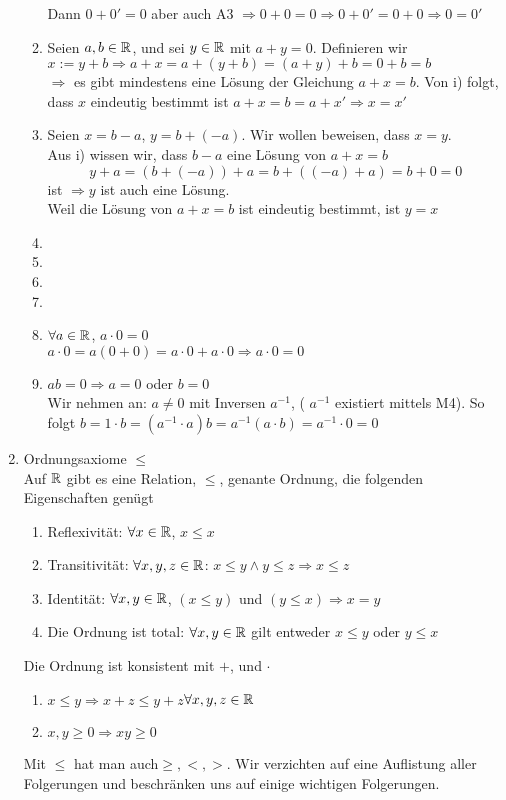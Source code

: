 \begin{enumerate}
\begin{enumerate}
\noindent Dann $0+0'=0$ aber auch A3 $\Rightarrow 0+0=0\Rightarrow 0+0'=0+0\Rightarrow 0=0'$
\item Seien $a,b\in\mathbb{R}$, und sei $y\in\mathbb{R}$ mit $a+y=0$. Definieren wir $x:=y+b\Rightarrow a+x=a+(y+b)=(a+y)+b=0+b=b$\\
$\Rightarrow$ es gibt mindestens eine Lösung der Gleichung $a+x=b$. Von i) folgt, dass $x$ eindeutig bestimmt ist $a+x=b=a+x' \Rightarrow x=x'$
\item Seien $x=b-a$, $y=b+(-a)$. Wir wollen beweisen, dass $x=y$.\\

\noindent Aus i) wissen wir, dass $b-a$ eine Lösung von $a+x=b$ \[y+a=\left( b+(-a)\right)+a=b+\left( (-a)+a\right)=b+0=0\] ist
$\Rightarrow y$ ist auch eine Lösung.\\
Weil die Lösung von $a+x=b$ ist eindeutig bestimmt, ist $y=x$
\item
\item
\item
\item
{}
\item $\forall a\in\mathbb{R}$, $a\cdot 0=0$\\
$a\cdot 0=a(0+0)=a\cdot 0+a\cdot 0\Rightarrow a\cdot 0=0$
\item $ab=0\Rightarrow a=0$ oder $b=0$\\
Wir nehmen an: $a\not=0$ mit  Inversen $a^{-1}$, ( $a^{-1}$ existiert mittels M4). So folgt $b=1\cdot b=\left( a^{-1}\cdot a\right)b=a^{-1}(a\cdot b)=a^{-1}\cdot 0=0$
\end{enumerate}
\item Ordnungsaxiome $\leq$\\
Auf $\mathbb{R}$ gibt es eine Relation, $\leq$, genante Ordnung, die folgenden Eigenschaften genügt
\begin{enumerate}
\item Reflexivität: $\forall x\in\mathbb{R}$, $x\leq x$
\item Transitivität: $\forall x,y,z\in\mathbb{R}$: $x\leq y\land y\leq z\Rightarrow x\leq z$
\item Identität: $\forall x,y\in\mathbb{R}$, $(x\leq y)$ und $(y\leq x)\Rightarrow x=y$
\item Die Ordnung ist total: $\forall x,y\in\mathbb{R}$ gilt entweder $x\leq y$ oder $y\leq x$
\end{enumerate}
Die Ordnung ist konsistent mit $+$, und $\cdot$
\begin{enumerate}
\item $x\leq y\Rightarrow x+z\leq y+z$\hspace{10mm}$\forall x,y,z\in\mathbb{R}$
\item $x,y\geq 0\Rightarrow xy\geq 0$
\end{enumerate}
Mit $\leq$ hat man auch$\geq,<,>$. Wir verzichten auf eine Auflistung aller Folgerungen und beschränken uns auf einige wichtigen Folgerungen.

\end{enumerate}
